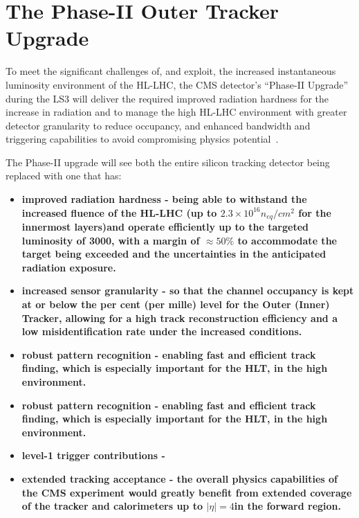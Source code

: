 
\section{The Phase-II Outer Tracker Upgrade}\label{sec:tk-upgrade}

To meet the significant challenges of, and exploit, the increased instantaneous luminosity environment of the HL-LHC, the CMS detector's ``Phase-II Upgrade'' during the LS3 will deliver the required improved radiation hardness for the increase in radiation and to manage the high \PU HL-LHC environment with greater detector granularity to reduce occupancy, and enhanced bandwidth and triggering capabilities to avoid compromising physics potential~\cite{CMSCollaboration:2015zni,P2TrackerTDR}.

The Phase-II upgrade will see both the entire silicon tracking detector being replaced with one that has:
\begin{itemize}
\item \bf{improved radiation hardness} - being able to withstand the increased fluence of the HL-LHC (up to $2.3\times10^{16} n_{eq}/cm^{2}$ for the innermost layers)and operate efficiently up to the targeted luminosity of 3000\fbinv, with a margin of $\approx50\%$ to accommodate the target being exceeded and the uncertainties in the anticipated radiation exposure.
\item \bf{increased sensor granularity} - so that the channel occupancy is kept at or below the per cent (per mille) level for the Outer (Inner) Tracker, allowing for a high track reconstruction efficiency and a low misidentification rate under the increased \PU conditions. 
\item \bf{robust pattern recognition} - enabling fast and efficient track finding, which is especially important for the HLT, in the high \PU environment.
\item \bf{robust pattern recognition} - enabling fast and efficient track finding, which is especially important for the HLT, in the high \PU environment.
\item \bf{level-1 trigger contributions} - 
\item \bf{extended tracking acceptance} - the overall physics capabilities of the CMS experiment would greatly benefit from extended coverage of the tracker and calorimeters up to $|\eta| = 4$in the forward region.
\end{itemize}

